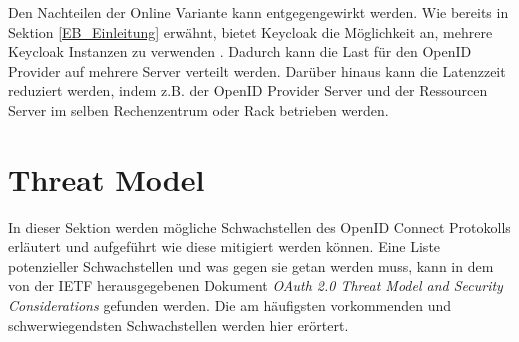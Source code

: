 Den Nachteilen der Online Variante kann entgegengewirkt werden. Wie bereits in Sektion \ref{EB_Einleitung} erwähnt, bietet Keycloak die Möglichkeit an, mehrere Keycloak Instanzen zu verwenden \cite{EB33}. Dadurch kann die Last für den OpenID Provider auf mehrere Server verteilt werden. Darüber hinaus kann die Latenzzeit reduziert werden, indem z.B. der OpenID Provider Server und der Ressourcen Server im selben Rechenzentrum oder Rack betrieben werden.







\section{Threat Model}

In dieser Sektion werden mögliche Schwachstellen des OpenID Connect Protokolls erläutert und aufgeführt wie diese mitigiert werden können. Eine Liste potenzieller Schwachstellen und was gegen sie getan werden muss, kann in dem von der IETF herausgegebenen Dokument \textit{OAuth 2.0 Threat Model and Security Considerations} \cite{RFC6819} gefunden werden. Die am häufigsten vorkommenden und schwerwiegendsten Schwachstellen werden hier erörtert. \cite{ssoProtocols}

